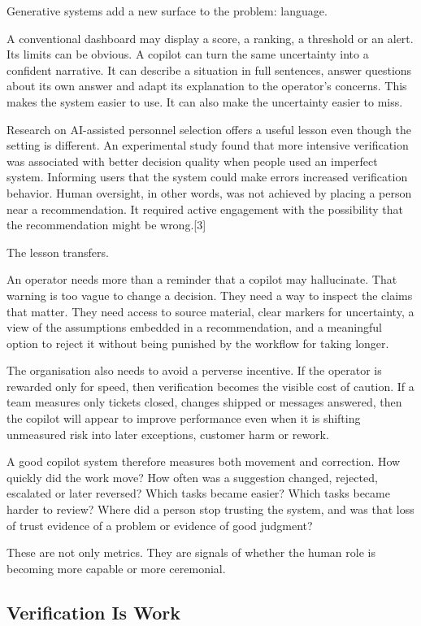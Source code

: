 Generative systems add a new surface to the problem: language.

A conventional dashboard may display a score, a ranking, a threshold or
an alert. Its limits can be obvious. A copilot can turn the same
uncertainty into a confident narrative. It can describe a situation in
full sentences, answer questions about its own answer and adapt its
explanation to the operator's concerns. This makes the system easier to
use. It can also make the uncertainty easier to miss.

Research on AI-assisted personnel selection offers a useful lesson even
though the setting is different. An experimental study found that more
intensive verification was associated with better decision quality when
people used an imperfect system. Informing users that the system could
make errors increased verification behavior. Human oversight, in other
words, was not achieved by placing a person near a recommendation. It
required active engagement with the possibility that the recommendation
might be wrong.{[}3{]}

The lesson transfers.

An operator needs more than a reminder that a copilot may hallucinate.
That warning is too vague to change a decision. They need a way to
inspect the claims that matter. They need access to source material,
clear markers for uncertainty, a view of the assumptions embedded in a
recommendation, and a meaningful option to reject it without being
punished by the workflow for taking longer.

The organisation also needs to avoid a perverse incentive. If the
operator is rewarded only for speed, then verification becomes the
visible cost of caution. If a team measures only tickets closed, changes
shipped or messages answered, then the copilot will appear to improve
performance even when it is shifting unmeasured risk into later
exceptions, customer harm or rework.

A good copilot system therefore measures both movement and correction.
How quickly did the work move? How often was a suggestion changed,
rejected, escalated or later reversed? Which tasks became easier? Which
tasks became harder to review? Where did a person stop trusting the
system, and was that loss of trust evidence of a problem or evidence of
good judgment?

These are not only metrics. They are signals of whether the human role
is becoming more capable or more ceremonial.

\subsection{Verification Is Work}\label{verification-is-work}

